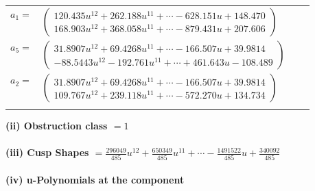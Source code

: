 \documentclass[1p]{elsarticle_modified}
\theoremstyle{definition}
\begin{document}
\begin{tabular}{m{7pt} m{180pt} m{7pt} m{180pt} }
\flushright $a_{1}=$&$\begin{pmatrix}120.435 u^{12}+262.188 u^{11}+\cdots-628.151 u+148.470\\168.903 u^{12}+368.058 u^{11}+\cdots-879.431 u+207.606\end{pmatrix}$ \\
\flushright $a_{5}=$&$\begin{pmatrix}31.8907 u^{12}+69.4268 u^{11}+\cdots-166.507 u+39.9814\\-88.5443 u^{12}-192.761 u^{11}+\cdots+461.643 u-108.489\end{pmatrix}$ \\
\flushright $a_{2}=$&$\begin{pmatrix}31.8907 u^{12}+69.4268 u^{11}+\cdots-166.507 u+39.9814\\109.767 u^{12}+239.118 u^{11}+\cdots-572.270 u+134.734\end{pmatrix}$\\&\end{tabular}
\flushleft \textbf{(ii) Obstruction class $= 1$}\\~\\
\flushleft \textbf{(iii) Cusp Shapes $= \frac{296049}{485} u^{12}+\frac{650349}{485} u^{11}+\cdots-\frac{1491522}{485} u+\frac{340092}{485}$}\\~\\
\newpage\renewcommand{\arraystretch}{1}
\flushleft \textbf{(iv) u-Polynomials at the component}\newline \\
\end{document}
